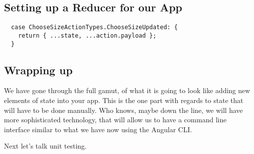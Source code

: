 \subsection{ Setting up a Reducer for our App }
\begin{lstlisting}
  case ChooseSizeActionTypes.ChooseSizeUpdated: {
    return { ...state, ...action.payload };
  }
\end{lstlisting}

\subsection{ Wrapping up }
We have gone through the full gamut, of what it is going to look like adding new
elements of state into your app. This is the one part with regards to state that
will have to be done manually. Who knows, maybe down the line, we will have more
sophisticated technology, that will allow us to have a command line interface
similar to what we have now using the Angular CLI.

Next let's talk unit testing. 
